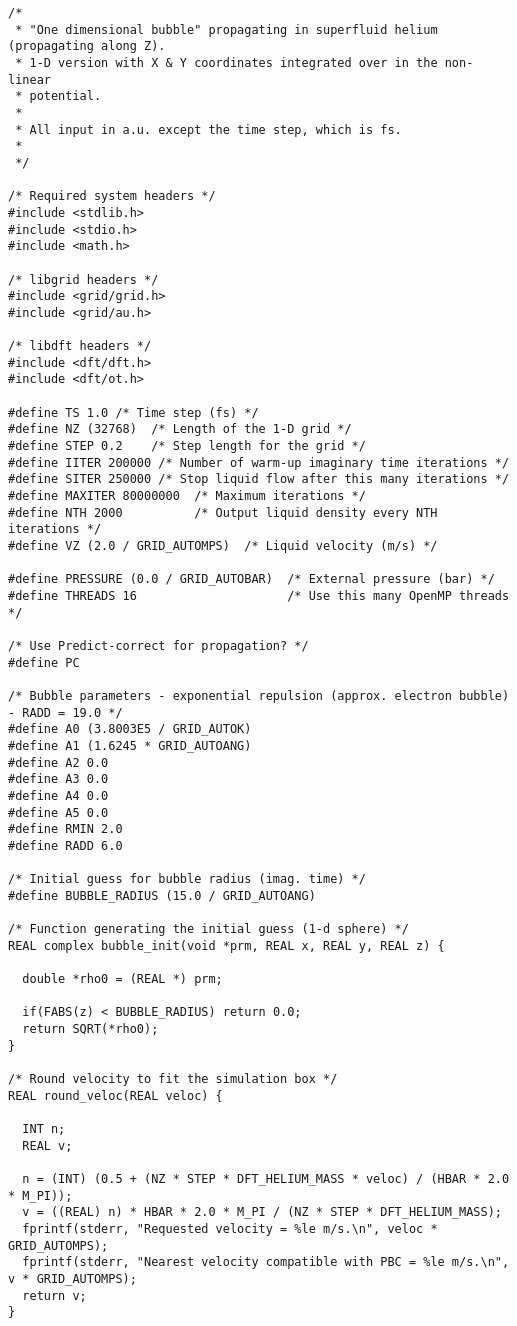 \documentclass[12pt,letterpaper]{report}
\begin{document}
\begin{verbatim}
/*
 * "One dimensional bubble" propagating in superfluid helium (propagating along Z).
 * 1-D version with X & Y coordinates integrated over in the non-linear
 * potential.
 *
 * All input in a.u. except the time step, which is fs.
 *
 */

/* Required system headers */
#include <stdlib.h>
#include <stdio.h>
#include <math.h>

/* libgrid headers */
#include <grid/grid.h>
#include <grid/au.h>

/* libdft headers */
#include <dft/dft.h>
#include <dft/ot.h>

#define TS 1.0 /* Time step (fs) */
#define NZ (32768)  /* Length of the 1-D grid */
#define STEP 0.2    /* Step length for the grid */
#define IITER 200000 /* Number of warm-up imaginary time iterations */
#define SITER 250000 /* Stop liquid flow after this many iterations */
#define MAXITER 80000000  /* Maximum iterations */
#define NTH 2000          /* Output liquid density every NTH iterations */
#define VZ (2.0 / GRID_AUTOMPS)  /* Liquid velocity (m/s) */

#define PRESSURE (0.0 / GRID_AUTOBAR)  /* External pressure (bar) */
#define THREADS 16                     /* Use this many OpenMP threads */

/* Use Predict-correct for propagation? */
#define PC

/* Bubble parameters - exponential repulsion (approx. electron bubble) - RADD = 19.0 */
#define A0 (3.8003E5 / GRID_AUTOK)
#define A1 (1.6245 * GRID_AUTOANG)
#define A2 0.0
#define A3 0.0
#define A4 0.0
#define A5 0.0
#define RMIN 2.0
#define RADD 6.0

/* Initial guess for bubble radius (imag. time) */
#define BUBBLE_RADIUS (15.0 / GRID_AUTOANG)

/* Function generating the initial guess (1-d sphere) */
REAL complex bubble_init(void *prm, REAL x, REAL y, REAL z) {

  double *rho0 = (REAL *) prm;

  if(FABS(z) < BUBBLE_RADIUS) return 0.0;
  return SQRT(*rho0);
}

/* Round velocity to fit the simulation box */
REAL round_veloc(REAL veloc) {

  INT n;
  REAL v;

  n = (INT) (0.5 + (NZ * STEP * DFT_HELIUM_MASS * veloc) / (HBAR * 2.0 * M_PI));
  v = ((REAL) n) * HBAR * 2.0 * M_PI / (NZ * STEP * DFT_HELIUM_MASS);
  fprintf(stderr, "Requested velocity = %le m/s.\n", veloc * GRID_AUTOMPS);
  fprintf(stderr, "Nearest velocity compatible with PBC = %le m/s.\n", v * GRID_AUTOMPS);
  return v;
}


\end{verbatim}
\end{document}

